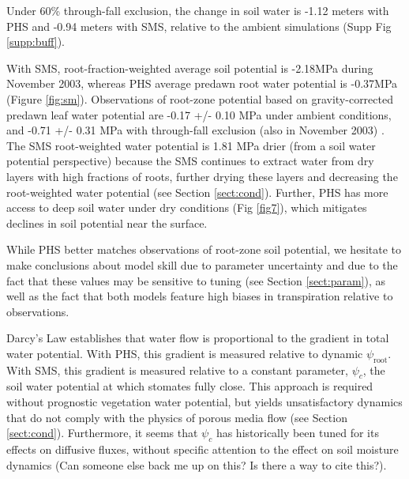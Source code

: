 \documentclass[draft,linenumbers]{agujournal}
\begin{document}
    Under 60\% through-fall exclusion, the change in soil water is -1.12 meters with PHS and -0.94 meters with SMS, relative to the ambient simulations (Supp Fig \ref{supp:buff}). 
    
    With SMS, root-fraction-weighted average soil potential is -2.18MPa during November 2003, whereas  PHS average predawn root water potential is -0.37MPa (Figure \ref{fig:sm}). Observations of root-zone potential based on gravity-corrected predawn leaf water potential are -0.17 +/- 0.10 MPa under ambient conditions, and -0.71 +/- 0.31 MPa with through-fall exclusion (also in November 2003) \citep{fisher2007}.  The SMS root-weighted water potential is 1.81 MPa drier (from a soil water potential perspective) because the SMS continues to extract water from dry layers with high fractions of roots, further drying these layers and decreasing the root-weighted water potential (see Section \ref{sect:cond}).  Further, PHS has more access to deep soil water under dry conditions (Fig \ref{fig7}), which mitigates declines in soil potential near the surface.
    
    While PHS better matches observations of root-zone soil potential, we hesitate to make conclusions about model skill due to parameter uncertainty and due to the fact that these values may be sensitive to tuning (see Section \ref{sect:param}), as well as the fact that both models feature high biases in transpiration relative to observations.
    
    Darcy's Law establishes that water flow is proportional to the gradient in total water potential. 
    With PHS, this gradient is measured relative to dynamic $\psi_{\text{root}}$.
    With SMS, this gradient is measured relative to a constant parameter, $\psi_c$, the soil water potential at which stomates fully close.
    This approach is required without prognostic vegetation water potential, but yields unsatisfactory dynamics that do not comply with the physics of porous media flow (see Section \ref{sect:cond}).
    Furthermore, it seems that $\psi_c$ has historically been tuned for its effects on diffusive fluxes, without specific attention to the effect on soil moisture dynamics 
    (Can someone else back me up on this? Is there a way to cite this?).
    
\end{document}
